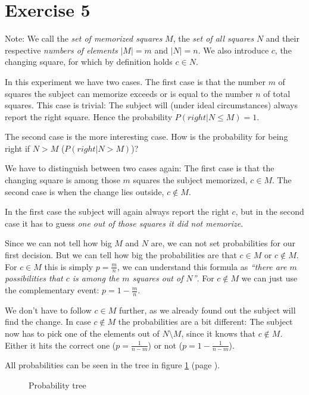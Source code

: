 \documentclass{article}
\begin{document}
\setcounter{equation}{0}
\section*{Exercise 5}
\footnotesize{ 
Note: We call the \textit{set of memorized squares} $M$, the 
\textit{set of all squares} $N$ and their respective \textit{numbers of elements} 
$|M| = m$ and $|N| = n$. We also introduce $c$, the changing square, for which 
by definition holds $c \in N$.}

In this experiment we have two cases. The first case is that the number $m$ of 
squares the subject can memorize exceeds or is equal to the number $n$ of total 
squares. This case is trivial: The subject will (under ideal circumstances) 
always report the right square. Hence the probability $P(right | N \leq M) = 1$.

The second case is the more interesting case. How is the probability for being 
right if $N > M$ ($P(right | N > M)$)?

We have to distinguish between two cases again: The first case is that the 
changing square is among those $m$ squares the subject memorized, $c \in M$. 
The second case is when the change lies outside, $c \notin M$.

In the first case the subject will again always report the right $c$, but in the
second case it has to guess \textit{one out of those squares it did not memorize}.

Since we can not tell how big $M$ and $N$ are, we can not set probabilities for 
our first decision. But we can tell how big the probabilities are that $c \in M$ 
or $c \notin M$. For $c \in M$ this is simply $p = \frac{m}{n}$, we can understand 
this formula as \textit{``there are $m$ possibilities that $c$ is among the $m$ 
squares out of $N$''}. For $c \notin M$ we can just use the complementary event:
$p = 1 - \frac{m}{n}$.

We don't have to follow $c \in M$ further, as we already found out the subject 
will find the change. In case $c \notin M$ the probabilities are a bit different: 
The subject now has to pick one of the elements out of $N \setminus M$, since it 
knows that $c \notin M$. Either it hits the correct one ($p = \frac{1}{n - m}$)
or not ($p = 1 - \frac{1}{n - m}$).

All probabilities can be seen in the tree in figure \ref{tree} (page \pageref{tree}).

\begin{figure}

\caption{Probability tree}
\label{tree}
\end{figure}
\end{document}
